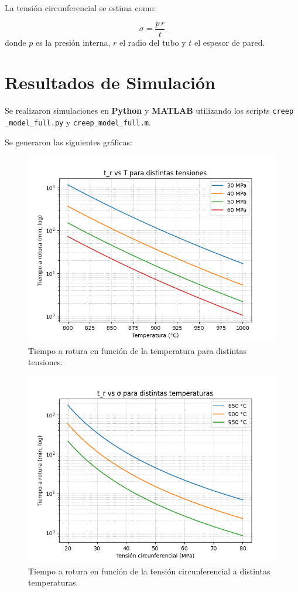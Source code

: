 \documentclass[12pt,a4paper]{article}
\begin{document}
La tensión circunferencial se estima como:

\begin{equation}
    \sigma = \frac{p \, r}{t}
\end{equation}
donde $p$ es la presión interna, $r$ el radio del tubo y $t$ el espesor de pared.

\section{Resultados de Simulación}
Se realizaron simulaciones en \textbf{Python} y \textbf{MATLAB} utilizando los scripts \texttt{creep \_model\_full.py} y \texttt{creep\_model\_full.m}.

Se generaron las siguientes gráficas:

\begin{figure}[H]
    \centering
    \includegraphics[width=0.7\linewidth]{Figuras/tr_vs_T.png}
    \caption{Tiempo a rotura en función de la temperatura para distintas tensiones.}
\end{figure}

\begin{figure}[H]
    \centering
    \includegraphics[width=0.7\linewidth]{Figuras/tr_vs_sigma.png}
    \caption{Tiempo a rotura en función de la tensión circunferencial a distintas temperaturas.}
\end{figure}
\end{document}
